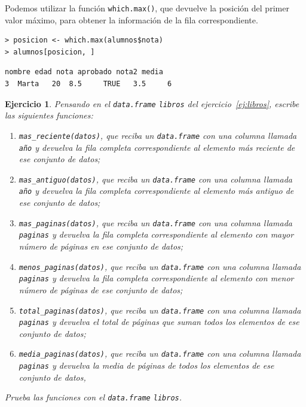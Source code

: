 \documentclass[11pt,a4paper]{article}
\theoremstyle{exercise}
\newtheorem{exercise}{Ejercicio}
\begin{document}
Podemos utilizar la función \texttt{which.max()}, que devuelve la posición del primer valor máximo, para obtener la información de la fila correspondiente.

\begin{lstlisting}[style=rconsole]
> posicion <- which.max(alumnos$nota)
> alumnos[posicion, ]
\end{lstlisting}

\begin{lstlisting}[style=routput]
  nombre edad nota aprobado nota2 media
3  Marta   20  8.5     TRUE   3.5     6
\end{lstlisting}




\begin{exercise}
Pensando en el \texttt{data.frame} \texttt{libros} del ejercicio~\ref{ej:libros}, escribe las siguientes funciones:
\begin{enumerate}
    \item \texttt{mas\_reciente(datos)}, que reciba un \texttt{data.frame} con una columna llamada \texttt{año} y devuelva la fila completa correspondiente al elemento más reciente de ese conjunto de datos;

    \item \texttt{mas\_antiguo(datos)}, que reciba un \texttt{data.frame} con una columna llamada \texttt{año} y devuelva la fila completa correspondiente al elemento más antiguo de ese conjunto de datos;
    
    \item \texttt{mas\_paginas(datos)}, que reciba un \texttt{data.frame} con una columna llamada \texttt{paginas} y devuelva la fila completa correspondiente al elemento con mayor número de páginas en ese conjunto de datos;
    
    \item \texttt{menos\_paginas(datos)}, que reciba un \texttt{data.frame} con una columna llamada \texttt{paginas} y devuelva la fila completa correspondiente al elemento con menor número de páginas de ese conjunto de datos;
    
    \item \texttt{total\_paginas(datos)}, que reciba un \texttt{data.frame} con una columna llamada \texttt{paginas} y devuelva el total de páginas que suman todos los elementos de ese conjunto de datos;
    
    \item \texttt{media\_paginas(datos)}, que reciba un \texttt{data.frame} con una columna llamada \texttt{paginas} y devuelva la media de páginas de todos los elementos de ese conjunto de datos,
\end{enumerate}
Prueba las funciones con el \texttt{data.frame} \texttt{libros}.
\end{exercise}
\end{document}
